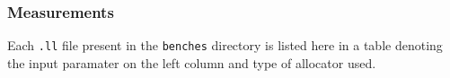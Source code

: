 \documentclass{article}
\begin{document}
\subsubsection{Measurements}

Each \lstinline!.ll! file present in the \lstinline!benches! directory is listed here in a table denoting the input paramater on the left column and type of allocator used.








%
\end{document}
